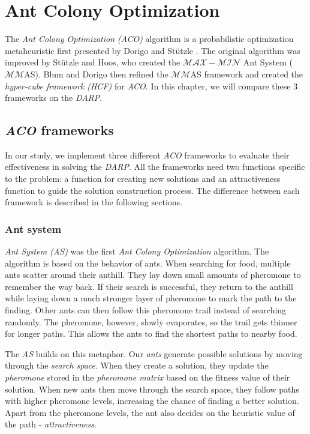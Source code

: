 \chapter{Ant Colony Optimization}\label{ch:aco}

The \textit{Ant Colony Optimization (ACO)} algorithm is a probabilistic optimization metaheuristic first presented by Dorigo and Stützle \cite{Dorigo2010}. The original algorithm was improved by Stützle and Hoos, who created the $\mathcal{MAX}\!{-}\!\mathcal{MIN}$ Ant System ($\mathcal{MM}$AS)\cite{STUTZLE2000889}. Blum and Dorigo then refined the $\mathcal{MM}$AS framework and created the \textit{hyper-cube framework (HCF)} for \textit{ACO}\cite{HCFMMAS}. In this chapter, we will compare these 3 frameworks on the \textit{DARP}.

\section{\textit{ACO} frameworks}

In our study, we implement three different \textit{ACO} frameworks to evaluate their effectiveness in solving the \textit{DARP}. All the frameworks need two functions specific to the problem: a function for creating new solutions and an attractiveness function to guide the solution construction process. The difference between each framework is described in the following sections.

\subsection{Ant system}

\textit{Ant System (AS)} was the first \textit{Ant Colony Optimization} algorithm. The algorithm is based on the behavior of ants. When searching for food, multiple ants scatter around their anthill. They lay down small amounts of pheromone to remember the way back. If their search is successful, they return to the anthill while laying down a much stronger layer of pheromone to mark the path to the finding. Other ants can then follow this pheromone trail instead of searching randomly. The pheromone, however, slowly evaporates, so the trail gets thinner for longer paths. This allows the ants to find the shortest paths to nearby food.

The \textit{AS} builds on this metaphor. Our \textit{ants} generate possible solutions by moving through the \textit{search space}. When they create a solution, they update the \textit{pheromone} stored in the \textit{pheromone matrix} based on the fitness value of their solution. When new ants then move through the search space, they follow paths with higher pheromone levels, increasing the chance of finding a better solution. Apart from the pheromone levels, the ant also decides on the heuristic value of the path - \textit{attractiveness}.

